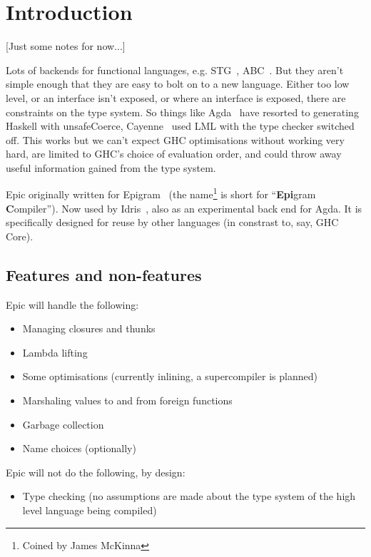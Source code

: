 \section{Introduction}

[Just some notes for now...]

Lots of backends for functional languages,
e.g. STG~\cite{evalpush,stg,llvm-haskell}, ABC~\cite{abc-machine}.
But they aren't simple enough that they are easy to bolt on to a new
language. Either too low level, or an interface isn't exposed, or
where an interface is exposed, there are constraints on the type
system. So things like Agda~\cite{norell-thesis} have resorted to
generating Haskell with unsafeCoerce, Cayenne~\cite{cayenne-icfp} used LML
with the type checker switched off. This works but we can't expect
GHC optimisations without working very hard, are limited to GHC's
choice of evaluation order, and could throw away useful information
gained from the type system.

Epic originally written for Epigram~\cite{levitation} (the
name\footnote{Coined by James McKinna} is
short for ``\textbf{Epi}gram \textbf{C}ompiler''). Now used by
Idris~\cite{idris-plpv}, also as an experimental back end for Agda.
It is specifically designed for reuse by other languages (in constrast
to, say, GHC Core).

\subsection{Features and non-features}

Epic will handle the following:

\begin{itemize}
\item Managing closures and thunks
\item Lambda lifting
\item Some optimisations (currently inlining, a supercompiler is planned)
\item Marshaling values to and from foreign functions
\item Garbage collection
\item Name choices (optionally)
\end{itemize}

\noindent
Epic will not do the following, by design:

\begin{itemize}
\item Type checking (no assumptions are made about the type system of
  the high level language being compiled)
\end{itemize}

